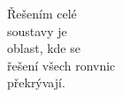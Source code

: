 \documentclass[preview]{standalone}
\begin{document}
\begin{center}
Řešením celé\\soustavy je\\oblast, kde se \\ řešení všech ronvnic\\  překrývají.
\end{center}
\end{document}
